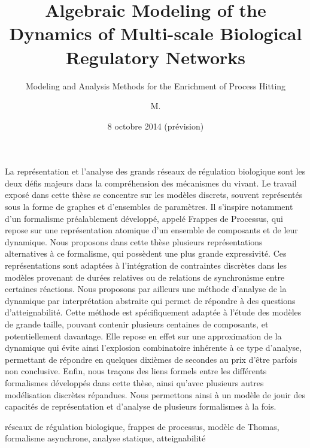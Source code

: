 \documentclass[12pt,french,francais,nofancyChapter,nofancyPart]{these-LUNAM}
\title{Algebraic Modeling of the Dynamics of Multi-scale
  Biological Regulatory Networks}
\subtitle{Modeling and Analysis Methods for the Enrichment of Process Hitting}
\author{M.}{Maxime}{Folschette}
\date{8 octobre 2014 (prévision)}
\theoremstyle{definition}
\theoremstyle{remark}
\begin{document}
\begin{resume}
  \scriptsize
  La représentation et l'analyse des grands réseaux de régulation biologique
  sont les deux défis majeurs dans la compréhension des mécanismes du vivant.
  Le travail exposé dans cette thèse se concentre sur les modèles discrets,
  souvent représentés sous la forme de graphes et d'ensembles de paramètres.
  Il s'inspire notamment d'un formalisme préalablement développé,
  appelé Frappes de Processus,
  qui repose sur une représentation atomique d'un ensemble de composants et de leur dynamique.
  Nous proposons dans cette thèse plusieurs représentations alternatives à
  ce formalisme, qui possèdent une plus grande expressivité.
  Ces représentations sont adaptées à l'intégration
  de contraintes discrètes dans les modèles
  provenant de durées relatives ou de relations de synchronisme entre certaines réactions.
  Nous proposons par ailleurs
  une méthode d'analyse de la dynamique par interprétation abstraite
  qui permet de répondre à des questions d'atteignabilité.
  Cette méthode est spécifiquement adaptée à l'étude des modèles de grande taille,
  pouvant contenir plusieurs centaines de composants, et potentiellement davantage.
  Elle repose en effet sur une approximation de la dynamique qui évite ainsi
  l'explosion combinatoire inhérente à ce type d'analyse,
  permettant de répondre en quelques dixièmes de secondes au prix d'être parfois non conclusive.
  Enfin, nous traçons des liens formels entre
  les différents formalismes développés dans cette
  thèse, ainsi qu'avec plusieurs autres modélisation discrètes répandues.
  Nous permettons ainsi à un modèle de jouir des capacités de représentation et d'analyse
  de plusieurs formalismes à la fois.
\end{resume}

\begin{motscles}
  réseaux de régulation biologique,
  frappes de processus,
  modèle de Thomas,
  formalisme asynchrone,
  analyse statique,
  atteignabilité
\end{motscles}
\end{document}
